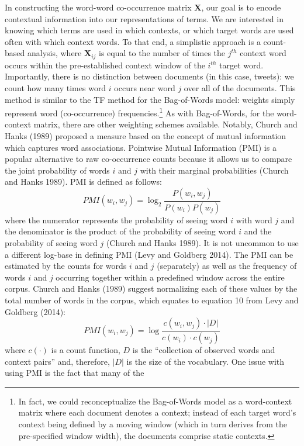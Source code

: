 \documentclass{article}
\begin{document}
In constructing the word-word co-occurrence matrix \(\mathbf{X}\), our
goal is to encode contextual information into our representations of
terms. We are interested in knowing which terms are used in which
contexts, or which target words are used often with which context words.
To that end, a simplistic approach is a count-based analysis, where
\(\mathbf{X}_{ij}\) is equal to the number of times the \(j^{th}\)
context word occurs within the pre-established context window of the
\(i^{th}\) target word. Importantly, there is no distinction between
documents (in this case, tweets): we count how many times word \(i\)
occurs near word \(j\) over all of the documents. This method is similar
to the TF method for the Bag-of-Words model: weights simply represent
word (co-occurrence) frequencies.\footnote{In fact, we could
  reconceptualize the Bag-of-Words model as a word-context matrix where
  each document denotes a context; instead of each target word's context
  being defined by a moving window (which in turn derives from the
  pre-specified window width), the documents comprise static contexts.}
As with Bag-of-Words, for the word-context matrix, there are other
weighting schemes available. Notably, Church and Hanks (1989) proposed a
measure based on the concept of mutual information which captures word
associations. Pointwise Mutual Information (PMI) is a popular
alternative to raw co-occurrence counts because it allows us to compare
the joint probability of words \(i\) and \(j\) with their marginal
probabilities (Church and Hanks 1989). PMI is defined as follows:
\[PMI(w_i, w_j) = \log_2 \frac {P(w_i, w_j)} {P(w_i)P(w_j)}\] where the
numerator represents the probability of seeing word \(i\) with word
\(j\) and the denominator is the product of the probability of seeing
word \(i\) and the probability of seeing word \(j\) (Church and Hanks
1989). It is not uncommon to use a different log-base in defining PMI
(Levy and Goldberg 2014). The PMI can be estimated by the counts for
words \(i\) and \(j\) (separately) as well as the frequency of words
\(i\) and \(j\) occurring together within a predefined window across the
entire corpus. Church and Hanks (1989) suggest normalizing each of these
values by the total number of words in the corpus, which equates to
equation 10 from Levy and Goldberg (2014):
\[PMI(w_i, w_j) = \log \frac {c(w_i, w_j) \cdot |D|} {c(w_i) \cdot c(w_j)}\]
where \(c(\cdot)\) is a count function, \(D\) is the ``collection of
observed words and context pairs'' and, therefore, \(|D|\) is the size
of the vocabulary. One issue with using PMI is the fact that many of the
\end{document}
